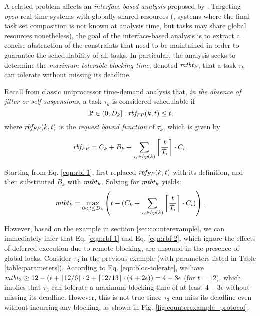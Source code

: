 A related problem affects an \emph{interface-based analysis}  proposed by \cite{NBN:11}. Targeting \emph{open} real-time systems with globally shared resources (\ie, systems where the final task set composition is not known at analysis time, but tasks may share global resources nonetheless), the goal of the interface-based analysis is to extract a concise abstraction of the constraints that need to be maintained in order  to guarantee the schedulability of all tasks. In particular, the analysis seeks to determine the \emph{maximum tolerable blocking time}, denoted $\mathit{mtbt}_k$, that a task $\tau_k$ can tolerate without missing its deadline. 

Recall from classic uniprocessor time-demand analysis \cite{lehoczky-1989} that, \emph{in the absence of jitter or self-suspensions}, a task $\tau_k$ is considered schedulable if
\begin{equation}
\label{eqn:rbf-1}
\exists t \in (0,D_k]: \mathit{rbf_{FP}}(k,t) \leq t, 
\end{equation}
where $\mathit{rbf_{FP}}(k,t)$ is the \emph{request bound function} of $\tau_k$, which is given by

\begin{equation}
\label{eqn:rbf-2}
\mathit{rbf_{FP}} = C_k + B_k + \sum_{\tau_i \in \mathit{hp}(k)} \left \lceil \frac{t}{T_i} \right \rceil \cdot C_i.
\end{equation}

Starting from Eq. \ref{eqn:rbf-1}, \cite{NBN:11} first  replaced $\mathit{rbf_{FP}}(k,t)$ with its definition, and then substituted  $B_k$ with $\mathit{mtbt}_k$. Solving for $\mathit{mtbt}_k$ yields:
\begin{equation}
\label{eqn:bloc-tolerate}
\mathit{mtbt}_k = \max_{0<t \leq D_k} \left( t - ( C_k + \sum_{\tau_i \in \mathit{hp}(k)} \left \lceil \frac{t}{T_i} \right \rceil \cdot C_i ) \right).
\end{equation}

However, based on the example in secition \ref{sec:counterexample}, we can immediately infer that Eq. \ref{eqn:rbf-1} and Eq. \ref{eqn:rbf-2}, which ignore the effects of deferred execution due to remote blocking, are unsound in the presence of global locks. Consider $\tau_3$ in the previous example (with parameters listed in Table \ref{table:parameters}). According to Eq. \ref{eqn:bloc-tolerate}, we have $\mathit{mtbt}_3 \geq 12 - (\epsilon + \lceil 12 / 6 \rceil \cdot 2 + \lceil 12 / 13 \rceil \cdot (4+2\epsilon)) = 4-3\epsilon$ (for $t=12$), which implies that $\tau_3$ can tolerate a maximum blocking time of at least $4-3\epsilon$ without missing its deadline. However, this is not true since $\tau_3$ can miss its deadline even without incurring any blocking, as shown in Fig. \ref{fig:counterexample_protocol}. 

